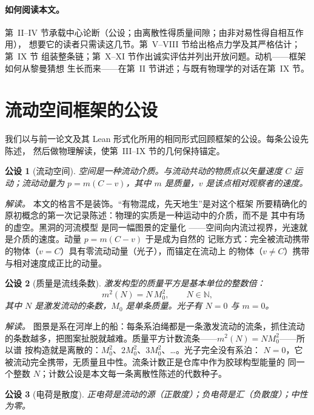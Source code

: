 \documentclass[aps,prd,preprint,superscriptaddress,amsmath,amssymb]{revtex4-2}
\newtheorem{postulate}{公设}[section]
\begin{document}
\paragraph{如何阅读本文。}
第~II--IV 节承载中心论断（公设；由离散性得质量间隙；由非对易性得自相互作用），
想要它的读者只需读这几节。第~V--VIII 节给出格点力学及其严格估计；第~IX 节
组装整条链；第~X--XI 节作出诚实评估并列出开放问题。动机——框架如何从黎曼猜想
生长而来——在第~II 节讲述；与既有物理学的对话在第~IX 节。

\section{流动空间框架的公设}
\label{sec:postulates}

我们以与前一论文及其 Lean 形式化所用的相同形式回顾框架的公设。每条公设先陈述，
然后做物理解读，使第~III--IX 节的几何保持锚定。

\begin{postulate}[流动空间]
\label{post:flow}
空间是一种流动介质。与流动共动的物质点以矢量速度 $C$ 运动；流动动量为
$p=m(C-v)$，其中 $m$ 是质量，$v$ 是该点相对观察者的速度。
\end{postulate}

\emph{解读。} 本文的格言不是装饰。``有物混成，先天地生''是对这个框架
所要精确化的原初概念的第一次记录陈述：物理的实质是一种运动中的介质，而不是
其中有场的虚空。黑洞的河流模型 \cite{hamilton2008river} 是同一幅图景的定量化
——空间向内流过视界，光速就是介质的速度。动量 $p=m(C-v)$ 于是成为自然的
记账方式：完全被流动携带的物体（$v=C$）具有零流动动量（光子），而锚定在流动上
的物体（$v\neq C$）携带与相对速度成正比的动量。

\begin{postulate}[质量是流线条数]
\label{post:mass}
激发构型的质量平方是基本单位的整数倍：
\begin{equation}
m^2(N)=N\,M_0^2,\qquad N\in\mathbb{N},
\end{equation}
其中 $N$ 是激发流动的条数，$M_0$ 是单条质量。光子有 $N=0$ 与 $m=0$。
\end{postulate}

\emph{解读。} 图景是系在河岸上的船：每条系泊绳都是一条激发流动的流条，抓住流动
的条数越多，把图案扯脱就越难。质量平方计数流条——$m^2(N)=N M_0^2$——所以谱
按构造就是离散的：$M_0^2$、$2M_0^2$、$3M_0^2$、\ldots。光子完全没有系泊：
$N=0$，它被流动完全携带，无质量且中性。流条计数正是仓库中作为胶球构型能量的
同一个整数 $N$；计数公设是本文每一条离散性陈述的代数种子。

\begin{postulate}[电荷是散度]
\label{post:charge}
正电荷是流动的源（正散度）；负电荷是汇（负散度）；中性为零。
\end{postulate}
\end{document}
